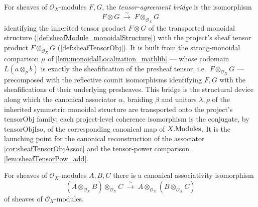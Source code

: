 \begin{definition}

  \label{def:tensorObjIso}
  For sheaves of \(\mathcal{O}_X\)-modules \(F, G\), the \emph{tensor-agreement
  bridge} is the isomorphism
  \[
    F \otimes G \;\xrightarrow{\ \sim\ }\;
      F \otimes_{\mathcal{O}_X} G
  \]
  identifying the inherited tensor product \(F \otimes G\) of the transported
  monoidal structure (\cref{def:sheafModule_monoidalStructure}) with the project's
  sheaf tensor product \(F \otimes_{\mathcal{O}_X} G\) (\cref{def:sheafTensorObj}).
  It is built from the strong-monoidal comparison \(\mu\) of
  \cref{lem:monoidalLocalization_mathlib} --- whose codomain
  \(L(a \otimes_{p} b)\) is exactly the sheafification of the presheaf tensor, i.e.\
  \(F \otimes_{\mathcal{O}_X} G\) --- precomposed with the reflective counit
  isomorphisms identifying \(F, G\) with the sheafifications of their underlying
  presheaves. This bridge is the structural device along which the canonical
  associator \(\alpha\), braiding \(\beta\) and unitors \(\lambda, \rho\) of the
  inherited symmetric monoidal structure are transported onto the project's
  \(\mathrm{tensorObj}\) family: each project-level coherence isomorphism is the
  conjugate, by \(\mathrm{tensorObjIso}\), of the corresponding canonical map of
  \(X.\mathrm{Modules}\). It is the launching point for the canonical reconstruction of
  the associator \cref{cor:sheafTensorObjAssoc} and the tensor-power comparison
  \cref{lem:sheafTensorPow_add}.
\end{definition}

\begin{corollary}

  \label{cor:sheafTensorObjAssoc}
  For sheaves of \(\mathcal{O}_X\)-modules \(A, B, C\) there is a canonical
  associativity isomorphism
  \[
    (A \otimes_{\mathcal{O}_X} B) \otimes_{\mathcal{O}_X} C
      \;\xrightarrow{\ \sim\ }\;
      A \otimes_{\mathcal{O}_X} (B \otimes_{\mathcal{O}_X} C)
  \]
  of sheaves of \(\mathcal{O}_X\)-modules.
\end{corollary}

